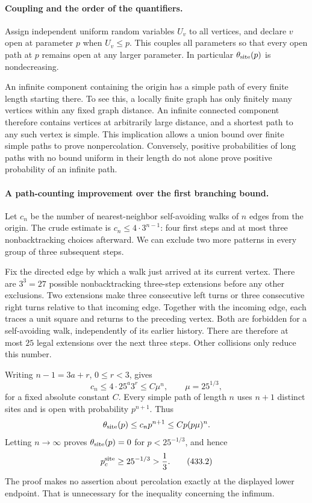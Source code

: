 \documentclass[11pt]{article}
\begin{document}
\paragraph{Coupling and the order of the quantifiers.}
Assign independent uniform random variables $U_v$ to all vertices, and declare $v$ open at parameter $p$ when $U_v\le p$. This couples all parameters so that every open path at $p$ remains open at any larger parameter. In particular $\theta_{\rm site}(p)$ is nondecreasing.

An infinite component containing the origin has a simple path of every finite length starting there. To see this, a locally finite graph has only finitely many vertices within any fixed graph distance. An infinite connected component therefore contains vertices at arbitrarily large distance, and a shortest path to any such vertex is simple. This implication allows a union bound over finite simple paths to prove nonpercolation. Conversely, positive probabilities of long paths with no bound uniform in their length do not alone prove positive probability of an infinite path.

\paragraph{A path-counting improvement over the first branching bound.}
Let $c_n$ be the number of nearest-neighbor self-avoiding walks of $n$ edges from the origin. The crude estimate is $c_n\le4\cdot3^{n-1}$: four first steps and at most three nonbacktracking choices afterward. We can exclude two more patterns in every group of three subsequent steps.

Fix the directed edge by which a walk just arrived at its current vertex. There are $3^3=27$ possible nonbacktracking three-step extensions before any other exclusions. Two extensions make three consecutive left turns or three consecutive right turns relative to that incoming edge. Together with the incoming edge, each traces a unit square and returns to the preceding vertex. Both are forbidden for a self-avoiding walk, independently of its earlier history. There are therefore at most $25$ legal extensions over the next three steps. Other collisions only reduce this number.

Writing $n-1=3a+r$, $0\le r<3$, gives
\[
 c_n\le4\cdot25^a3^r\le C\mu^n,
 \qquad \mu=25^{1/3}, \tag{433.1}
\]
for a fixed absolute constant $C$. Every simple path of length $n$ uses $n+1$ distinct sites and is open with probability $p^{n+1}$. Thus
\[
 \theta_{\rm site}(p)\le c_np^{n+1}\le Cp(p\mu)^n.
\]
Letting $n\to\infty$ proves $\theta_{\rm site}(p)=0$ for $p<25^{-1/3}$, and hence
\[
 p_c^{\rm site}\ge25^{-1/3}>\frac13. \tag{433.2}
\]
The proof makes no assertion about percolation exactly at the displayed lower endpoint. That is unnecessary for the inequality concerning the infimum.
\end{document}
